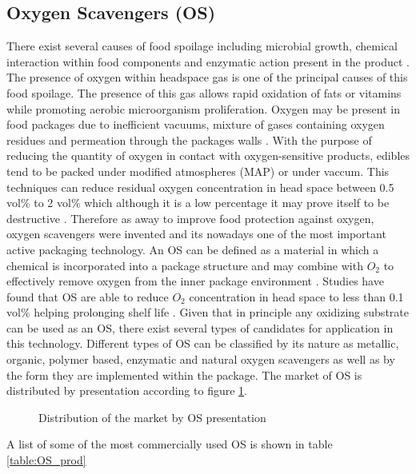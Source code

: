 \begin{refsection}
\section{Oxygen Scavengers (OS)}\label{sec:OS}
There exist several causes of food spoilage including microbial growth,  chemical interaction within food components and enzymatic action present in the product \cite{Gaikwad2018OxygenPackaging}. The presence of oxygen within headspace gas is one of the principal causes of this food spoilage. The presence of this gas allows rapid oxidation of fats or vitamins while promoting aerobic microorganism proliferation. Oxygen may be present in food packages due to inefficient vacuums,  mixture of gases containing oxygen residues and permeation through the packages walls \cite{Souza2012OxygenPreservation}. With the purpose of reducing the quantity of oxygen in contact with oxygen-sensitive products, edibles tend to be packed under modified atmospheres (MAP) or under vaccum. This techniques can reduce residual oxygen concentration in head space between 0.5 vol\% to 2 vol\% which although it is a low percentage it may prove itself  to be destructive \cite{Gibis2011OxygenApplication}.   Therefore as away to improve food protection against oxygen, oxygen scavengers were invented and its nowadays one of the most important active packaging technology. An OS can be defined as a material in which a chemical  is incorporated into a package structure and may combine with $O_2$ to effectively remove oxygen from the inner package environment \cites{brody2001active}{Cooksey2010OxygenSystems}. Studies have found that OS are able to reduce $O_2$ concentration in head space to less than 0.1 vol\% helping prolonging shelf life \cite{Mills2006DemonstrationFilm}.
Given that in principle any oxidizing substrate can be used as an OS,  there exist several types of candidates for application in this technology. Different types of OS can be classified by its nature as metallic, organic, polymer based, enzymatic and natural oxygen scavengers \cites{Gaikwad2018OxygenPackaging}{Dey2019OxygenReview} as well as by the form they are implemented within the package. The market of OS is distributed by presentation according to figure \ref{fig:presentacio_os}. 
\begin{figure}[H]
        \centering
        \caption{Distribution of the market by OS presentation \cite{Cooksey2010OxygenSystems}}
        \label{fig:presentacio_os}
\end{figure}
 A list of some of the most commercially used OS is shown in table  \ref{table:OS_prod}


\end{refsection}

